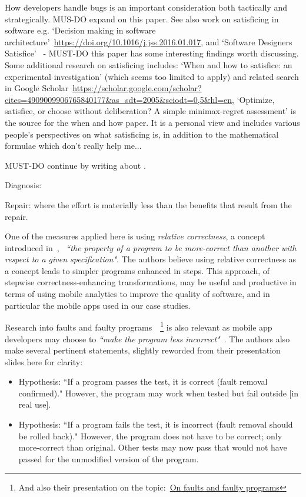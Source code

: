 How developers handle bugs is an important consideration both tactically and strategically. \citet{lopez2021_bumps_in_the_code_error_handling_during_software_development} MUS-DO expand on this paper. See also work on satisficing in software e.g. `Decision making in software architecture'~\url{https://doi.org/10.1016/j.jss.2016.01.017}, and `Software Designers Satisfice'~\citep{tang2015_software_designers_satisfice} - MUST-DO this paper has some interesting findings worth discussing. 
%
Some additional research on satisficing includes: `When and how to satisfice: an experimental investigation' (which seems too limited to apply) and related search in Google Scholar~\url{https://scholar.google.com/scholar?cites=4909009906765840177&as_sdt=2005&sciodt=0,5&hl=en}, `Optimize, satisfice, or choose without deliberation? A simple minimax-regret assessment' is the source for the when and how paper. It is a personal view and includes various people's perspectives on what satisficing is, in addition to the mathematical formulae which don't really help me...



MUST-DO continue by writing about \citep{avizienis2004_basic_concepts_and_taxonomy}.


Diagnosis:

Repair: where the effort is materially less than the benefits that result from the repair. 


One of the measures applied here is using \emph{relative correctness}, a concept introduced in~\cite{diallo2015_correctness_and_relative_correctness}, ~\emph{``the
property of a program to be more-correct than another with respect to a given specification"}. The authors believe using relative correctness as a concept leads to simpler programs enhanced  in steps. This approach, of stepwise correctness-enhancing transformations, may be useful and productive in terms of using mobile analytics to improve the quality of software, and in particular the mobile apps used in our case studies. 

Research into faults and faulty programs~\cite{mili2014_on_faults_and_faulty_programs}~\footnote{And also their presentation on the topic:~\href{http://mathcs.chapman.edu/ramics2014/slides/MiliFriasJaouaRAMiCS2014.pdf}{On faults and faulty programs}} is also relevant as mobile app developers may choose to \emph{``make the program less incorrect"}~\cite{mili2014_on_faults_and_faulty_programs}. The authors also make several pertinent statements, slightly reworded from their presentation slides here for clarity:
\begin{itemize}
    \item Hypothesis: ``If a program passes the test, it is correct (fault removal confirmed)." However, the program may work when tested but fail outside [in real use].
    \item Hypothesis: ``If a program fails the test, it is incorrect (fault removal should be rolled back)." However, the program does not have to be correct; only more-correct than original. Other tests may now pass that would not have passed for the unmodified version of the program.
\end{itemize}

